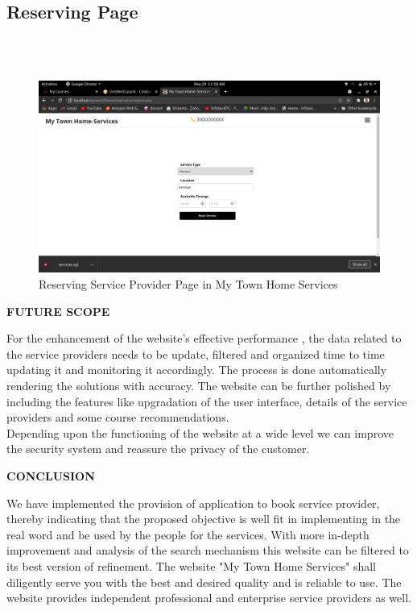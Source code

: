 \documentclass[12pt,a4paper]{report}
\begin{document}
\begin{titlepage}
{{\section{ Reserving Page}\\ \\[3.0cm]
\begin{figure}[h!]
	\begin{center}
		 \includegraphics[width=\linewidth,height=0.5\textheight]{reserve.jpeg}
	\end{center}
	\caption{Reserving Service Provider Page in My Town Home Services}
\end{figure}
\textbf{ }
{\raggedright
\textbf{ }\textbf{ }
{\raggedright
\newpage
{}
\begin{center}
\LARGE \textbf{FUTURE SCOPE}\\[2.0cm]
\end{center}
For the enhancement of the website's effective performance , the data related to the service providers needs to be update, filtered and organized time to time updating it and monitoring it accordingly. The process is done automatically rendering the solutions with accuracy. The website can be further polished by including the features like upgradation of the user interface, details of the service providers and some course recommendations.\\  
Depending upon the functioning of the website at a wide level we can improve the security system and reassure the privacy of the customer.

\newpage

\begin{center}
\LARGE \textbf{CONCLUSION}\\[2.0cm]
\end{center}
We have implemented the provision of application to book service provider, thereby indicating that the proposed objective is well fit in implementing in the real word and be used by the people for the services. With more in-depth improvement and analysis of the search mechanism this website can  be  filtered to its best version of refinement. The website "My Town Home Services" shall diligently serve you with the best and desired quality and is reliable to use. The website provides independent professional and enterprise service providers as well. \\

}}}}
\end{titlepage}
\end{document}
